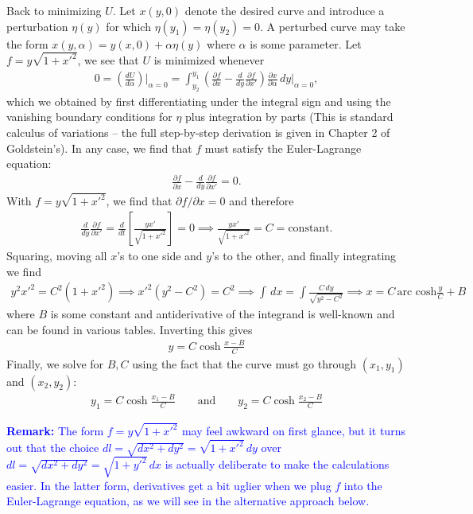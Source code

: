\documentclass{article}
\theoremstyle{definition}
\newcommand{\p}{\partial}
\newcommand{\al}{\alpha}
\newcommand{\f}[2]{\frac{#1}{#2}}
\newcommand{\lp}{\left(}
\newcommand{\rp}{\right)}
\newcommand{\lb}{\left[}
\newcommand{\rb}{\right]}
\begin{document}
Back to minimizing $U$. Let $x(y,0)$ denote the desired curve and introduce a perturbation $\eta(y)$ for which $\eta(y_1) = \eta(y_2)=0$. A perturbed curve may take the form $x(y,\al) = y(x,0)+\al \eta(y)$ where $\al$ is some parameter. Let $f = y\sqrt{1+x'^2}$, we see that $U$ is minimized whenever 
\begin{align*}
0 = \lp \f{dU}{d\al} \rp\bigg\vert_{\al=0} = \int^{y_1}_{y_2} \lp \f{\p f}{\p x} - \f{d}{dy}\f{\p f}{\p x'} \rp \f{\p x}{\p \al}\,dy\bigg\vert_{\al=0},
\end{align*}
which we obtained by first differentiating under the integral sign and using the vanishing boundary conditions for $\eta$ plus integration by parts (This is standard calculus of variations -- the full step-by-step derivation is given in Chapter 2 of Goldstein's). In any case, we find that $f$ must satisfy the Euler-Lagrange equation:
\begin{align*}
\f{\p f}{\p x} - \f{d}{dy}\f{\p f}{\p x'} =0.
\end{align*}
With $f=y\sqrt{1+x'^2}$, we find that $\p f/\p x = 0$ and therefore
\begin{align*}
\f{d}{dy} \f{\p f}{\p x'} = \f{d}{dt} \lb \f{yx'}{\sqrt{1+x'^2}} \rb = 0 \implies \f{yx'}{\sqrt{1+x'^2}} = C = \text{constant}.
\end{align*}
Squaring, moving all $x$'s to one side and $y$'s to the other, and finally integrating we find 
\begin{align*}
y^2 x'^2 = C^2(1+x'^2) \implies x'^2(y^2 - C^2) = C^2 \implies \int \,dx = \int \f{C\,dy}{\sqrt{y^2 - C^2}} \implies x = C\,\text{arc cosh} \f{y}{C} + B
\end{align*}
where $B$ is some constant and antiderivative of the integrand is well-known and can be found in various tables. Inverting this gives
\begin{align*}
\boxed{y = C\cosh \f{x-B}{C}}
\end{align*}
Finally, we solve for $B,C$ using the fact that the curve must go through $(x_1,y_1)$ and $(x_2,y_2)$:
\begin{align*}
\boxed{y_1 = C\cosh \f{x_1-B}{C}\quad\quad \text{and} \quad\quad y_2 = C\cosh \f{x_2-B}{C}}
\end{align*}

\noindent \textcolor{blue}{\textbf{Remark:} The form $f = y\sqrt{1+x'^2}$ may feel awkward on first glance, but it turns out that the choice $dl =\sqrt{dx^2 + dy^2} = \sqrt{1+x'^2}\,dy$ over $dl = \sqrt{dx^2+dy^2} = \sqrt{1+y'^2}\,dx$ is actually deliberate to make the calculations easier. In the latter form, derivatives get a bit uglier when we plug $f$ into the Euler-Lagrange equation, as we will see in the alternative approach below.}\\
\end{document}
